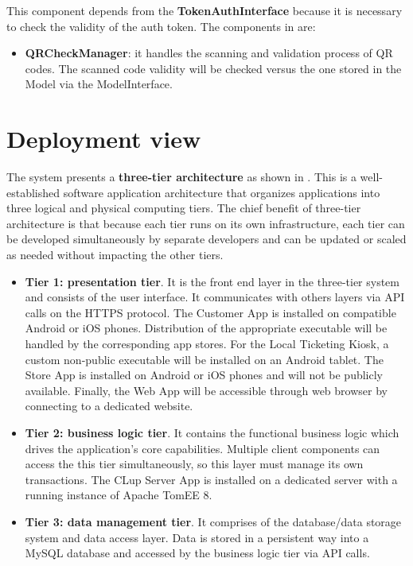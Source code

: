 This component depends from the \textbf{TokenAuthInterface} because it is necessary to check the validity of the auth token. The components in  are:
\begin{itemize}
	\item \textbf{QRCheckManager}: it handles the scanning and validation process of QR codes. The scanned code validity will be checked versus the one stored in the Model via the ModelInterface.
\end{itemize}
\clearpage

\section{Deployment view}\label{sec:deployment_view}
The system presents a \textbf{three-tier architecture} as shown in . This is a well-established software application architecture that organizes applications into three logical and physical computing tiers. The chief benefit of three-tier architecture is that because each tier runs on its own infrastructure, each tier can be developed simultaneously by separate developers and can be updated or scaled as needed without impacting the other tiers.

\begin{itemize}
	\item \textbf{Tier 1: presentation tier}. It is the front end layer in the three-tier system and consists of the user interface. It communicates with others layers via API calls on the HTTPS protocol.\newline
	The Customer App is installed on compatible Android or iOS phones. Distribution of the appropriate executable will be handled by the corresponding app stores. For the Local Ticketing Kiosk, a custom non-public executable will be installed on an Android tablet.\newline
	The Store App is installed on Android or iOS phones and will not be publicly available.\newline
	Finally, the Web App will be accessible through web browser by connecting to a dedicated website.
	
	\item \textbf{Tier 2: business logic tier}. It contains the functional business logic which drives the application’s core capabilities. Multiple client components can access the this tier simultaneously, so this layer must manage its own transactions.\newline
	The CLup Server App is installed on a dedicated server with a running instance of Apache TomEE 8.
	
	\item \textbf{Tier 3: data management tier}. It comprises of the database/data storage system and data access layer. Data is stored in a persistent way into a MySQL database and accessed by the business logic tier via API calls.
\end{itemize}


